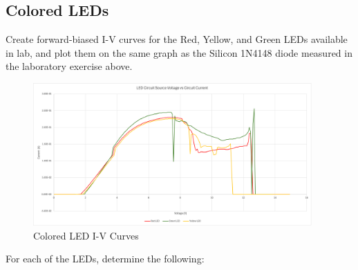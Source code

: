 \documentclass[12pt]{article}
\begin{document}
\subsection{Colored LEDs}
Create forward-biased I-V curves for the Red, Yellow, and Green
LEDs available in lab, and plot them on the same graph as the
Silicon 1N4148 diode measured in the laboratory exercise above.
\begin{figure}[h]
\centering
\includegraphics[width=0.95\textwidth]{LED_Circuit.png}
\caption{Colored LED I-V Curves}
\label{fig:colored-leds}
\end{figure}
For each of the LEDs, determine the following:
\end{document}
